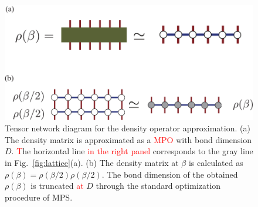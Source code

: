 \documentclass[twocolumn,superscriptaddress,showpacs, longbibliography, aps, prb]{revtex4-2}
\newcommand{\red}[1]{\textcolor{red}{#1}}
\begin{document}
\begin{figure}
  \begin{center}
    \includegraphics[width=\linewidth]{Figs/XTRG_MPO.pdf}
  \end{center}
  \caption{Tensor network diagram for the density operator approximation. (a) The density matrix is approximated as a %
\red{MPO} with bond dimension $D$. %
\red{T}he horizontal line \red{in the right panel} corresponds to the gray line in Fig.~\ref{fig:lattice}(a). (b) The density matrix at $\beta$ is calculated as $\rho(\beta)=\rho(\beta/2)\rho(\beta/2)$. The bond dimension of the obtained $\rho(\beta)$ is truncated %
\red{at} $D$ through the standard optimization procedure of MPS.}
  \label{fig:XTRG}
\end{figure}
\end{document}
